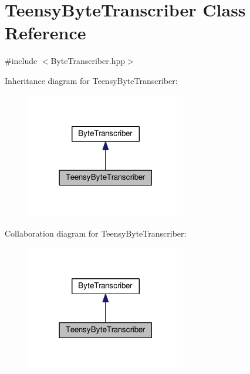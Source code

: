 \hypertarget{classTeensyByteTranscriber}{}\section{Teensy\+Byte\+Transcriber Class Reference}
\label{classTeensyByteTranscriber}


{\ttfamily \#include $<$Byte\+Transcriber.\+hpp$>$}



Inheritance diagram for Teensy\+Byte\+Transcriber\+:\nopagebreak
\begin{figure}[H]
\begin{center}
\leavevmode
\includegraphics[width=198pt]{classTeensyByteTranscriber__inherit__graph}
\end{center}
\end{figure}


Collaboration diagram for Teensy\+Byte\+Transcriber\+:\nopagebreak
\begin{figure}[H]
\begin{center}
\leavevmode
\includegraphics[width=198pt]{classTeensyByteTranscriber__coll__graph}
\end{center}
\end{figure}
